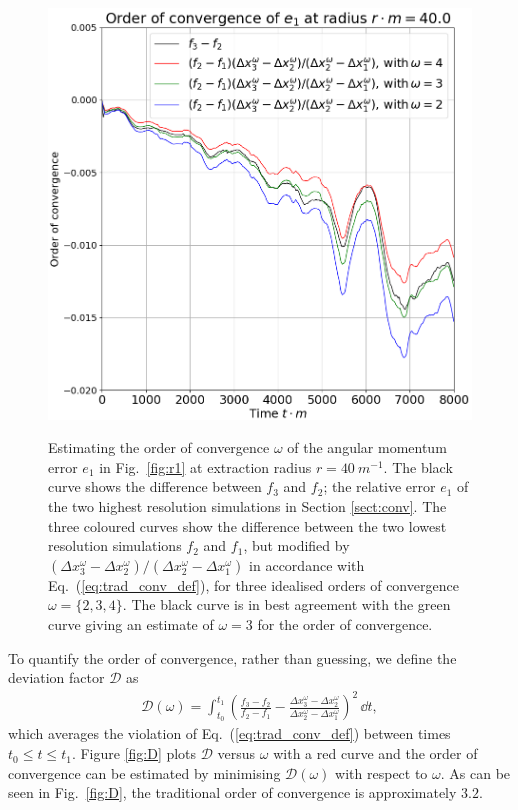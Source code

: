\begin{figure}[h]
{\includegraphics[width=0.95\columnwidth]{png/paper_conv123.png}}
\caption{Estimating the order of convergence $\omega$ of the angular momentum error $e_1$ in Fig.~\ref{fig:r1} at extraction radius $r=40 ~m^{-1}$. The black curve shows the difference between $f_3$ and $f_2$; the relative error $e_1$ of the two highest resolution simulations in Section \ref{sect:conv}. The three coloured curves show the difference between the two lowest resolution simulations $f_2$ and $f_1$, but modified by $(\Delta x_3^\omega - \Delta x_2^\omega)/(\Delta x_2^\omega - \Delta x_1^\omega)$ in accordance with Eq.~(\ref{eq:trad_conv_def}), for three idealised orders of convergence $\omega=\{2,3,4\}$. The black curve is in best agreement with the green curve giving an estimate of $\omega=3$ for the order of convergence. }
\label{fig:234}
\end{figure}



To quantify the order of convergence, rather than guessing, we define the deviation factor $\mathcal{D}$ as
\begin{align}\label{eq:tradconv}
\mathcal{D}(\omega) = \int_{t_0}^{t_1}\left(\frac{f_3-f_2}{f_2-f_1} - \frac{ \Delta x_3^\omega-\Delta x_2^\omega }{ \Delta x_2^\omega-\Delta x_1^\omega }\right)^2\,\dd t,
\end{align}
which averages the violation of Eq.~(\ref{eq:trad_conv_def}) between times $t_0\leq t\leq t_1$. Figure \ref{fig:D} plots $\mathcal{D}$ versus $\omega$ with a red curve and the order of convergence can be estimated by minimising $\mathcal{D}(\omega)$ with respect to $\omega$. As can be seen in Fig.~\ref{fig:D}, the traditional order of convergence is approximately $3.2$.


